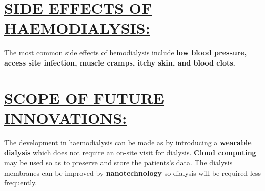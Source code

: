 \documentclass[12pt]{article}
\begin{document}
\section{\underline{SIDE EFFECTS OF HAEMODIALYSIS:}}
The most common side effects of hemodialysis include \textbf{low blood pressure, access site infection, muscle cramps, itchy skin, and blood clots.}
\section{\underline{SCOPE OF FUTURE INNOVATIONS:}}
The development in haemodialysis can be made as by introducing a \textbf{wearable dialysis} which does not require an on-site visit for dialysis. 
\textbf{Cloud computing} may be used so as to preserve and store the patients’s data.
The dialysis membranes can be improved by \textbf{nanotechnology} so dialysis will be required less frequently.
\end{document}
